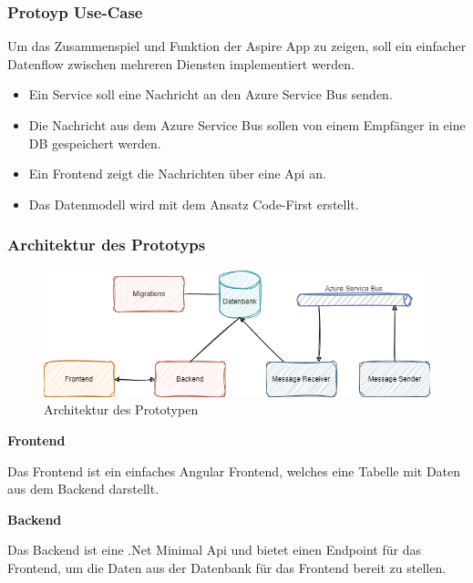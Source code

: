         \subsubsection{Protoyp Use-Case}
            Um das Zusammenspiel und Funktion der Aspire App zu zeigen, soll ein einfacher Datenflow zwischen mehreren Diensten implementiert werden. 
            \begin{itemize}
                \item Ein Service soll eine Nachricht an den Azure Service Bus senden.
                \item Die Nachricht aus dem Azure Service Bus sollen von einem Empfänger in eine DB gespeichert werden.
                \item Ein Frontend zeigt die Nachrichten über eine Api an.
                \item Das Datenmodell wird mit dem Ansatz Code-First erstellt.
            \end{itemize}

        \subsubsection{Architektur des Prototyps}
            \begin{figure}[ht]
                \centering
                \includegraphics[scale=0.55]{Ressources/Bilder/Architektur.Prototyp.drawio.png}
                \caption{Architektur des Prototypen}
                \label{fig:architecture}
            \end{figure}            

            \textbf{Frontend}

            Das Frontend ist ein einfaches Angular Frontend, welches eine Tabelle mit Daten aus dem Backend darstellt.

            \textbf{Backend}

            Das Backend ist eine .Net Minimal Api und bietet einen Endpoint für das Frontend, um die Daten aus der Datenbank für das Frontend bereit zu stellen. 

